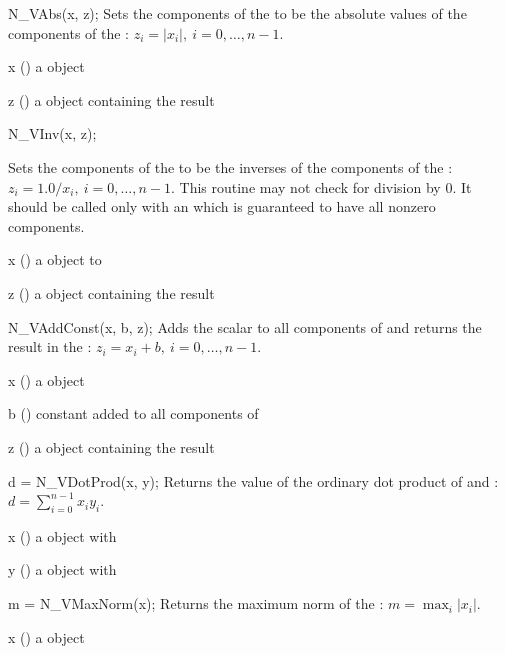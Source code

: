 {
  N\_VAbs(x, z);
}
{
  Sets the components of the   to be the absolute
  values of the components of the  :
  $z_i = | x_i | , \: i=0,\ldots,n-1$.
}
{
  \begin{args}[x]
  \item[x] () a {\nvector} object
  \item[z] () a {\nvector} object containing the result
  \end{args}
}
{}
{}

{
  N\_VInv(x, z);
}
{

  Sets the components of the   to be the inverses
  of the components of the  :
  $z_i = 1.0 /  x_i  , \: i=0,\ldots,n-1$. This routine
  may not check for division by $0$. It should be called only with an
   which is guaranteed to have all nonzero components.
}
{
  \begin{args}[x]
  \item[x] () a {\nvector} object to
  \item[z] () a {\nvector} object containing the result
  \end{args}
}
{}
{}

{
  N\_VAddConst(x, b, z);
}
{
  Adds the  scalar  to all components of 
  and returns the result in the  :
  $z_i = x_i + b , \: i=0,\ldots,n-1$.
}
{
  \begin{args}[x]
  \item[x] () a {\nvector} object
  \item[b] () constant added to all components of 
  \item[z] () a {\nvector} object containing the result
  \end{args}
}
{}
{}

{
  d = N\_VDotProd(x, y);
}
{
  Returns the value of the ordinary dot product of  and :
  $d=\sum_{i=0}^{n-1} x_i y_i$.
}
{
  \begin{args}[x]
  \item[x] () a {\nvector} object
    with 
  \item[y] () a {\nvector} object
    with 
  \end{args}
}
{
}
{}

{
  m = N\_VMaxNorm(x);
}
{
  Returns the maximum norm of the  :
  $m = \max_{i} | x_i |$.
}
{
  \begin{args}[x]
  \item[x] () a {\nvector} object
  \end{args}
}
{
}
{}

